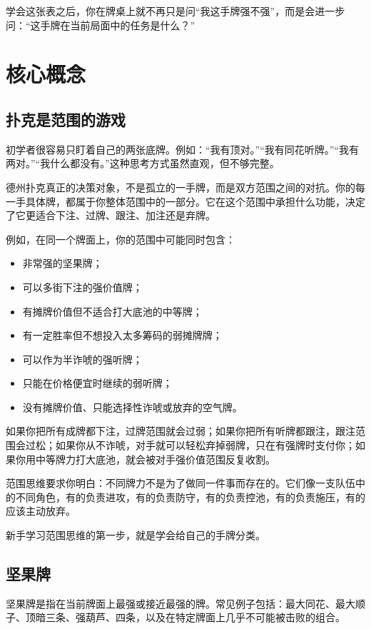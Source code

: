 学会这张表之后，你在牌桌上就不再只是问“我这手牌强不强”，而是会进一步问：“这手牌在当前局面中的任务是什么？”

\section{核心概念}

\subsection{扑克是范围的游戏}

初学者很容易只盯着自己的两张底牌。例如：“我有顶对。”“我有同花听牌。”“我有两对。”“我什么都没有。”这种思考方式虽然直观，但不够完整。

德州扑克真正的决策对象，不是孤立的一手牌，而是双方范围之间的对抗。你的每一手具体牌，都属于你整体范围中的一部分。它在这个范围中承担什么功能，决定了它更适合下注、过牌、跟注、加注还是弃牌。

例如，在同一个牌面上，你的范围中可能同时包含：

\begin{itemize}
\item 非常强的坚果牌；
\item 可以多街下注的强价值牌；
\item 有摊牌价值但不适合打大底池的中等牌；
\item 有一定胜率但不想投入太多筹码的弱摊牌牌；
\item 可以作为半诈唬的强听牌；
\item 只能在价格便宜时继续的弱听牌；
\item 没有摊牌价值、只能选择性诈唬或放弃的空气牌。
\end{itemize}

如果你把所有成牌都下注，过牌范围就会过弱；如果你把所有听牌都跟注，跟注范围会过松；如果你从不诈唬，对手就可以轻松弃掉弱牌，只在有强牌时支付你；如果你用中等牌力打大底池，就会被对手强价值范围反复收割。

范围思维要求你明白：不同牌力不是为了做同一件事而存在的。它们像一支队伍中的不同角色，有的负责进攻，有的负责防守，有的负责控池，有的负责施压，有的应该主动放弃。

新手学习范围思维的第一步，就是学会给自己的手牌分类。

\subsection{坚果牌}

坚果牌是指在当前牌面上最强或接近最强的牌。常见例子包括：最大同花、最大顺子、顶暗三条、强葫芦、四条，以及在特定牌面上几乎不可能被击败的组合。

